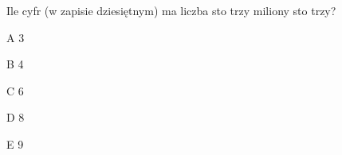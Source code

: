 \begin{tresc}
Ile cyfr (w zapisie dziesiętnym) ma liczba sto trzy miliony sto trzy?
\end{tresc}
\begin{wariant}{A} 3 \end{wariant}
\begin{wariant}{B} 4 \end{wariant}
\begin{wariant}{C} 6 \end{wariant}
\begin{wariant}{D} 8 \end{wariant}
\begin{wariant}{E} 9 \end{wariant}
